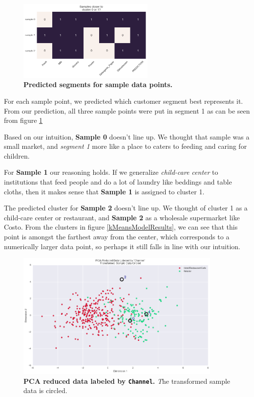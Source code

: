 \documentclass[twoside,openright,titlepage,numbers=noenddot,headinclude,%
               footinclude=true,cleardoublepage=empty,abstractoff,BCOR=5mm,%
               paper=a4,fontsize=11pt,ngerman,american]{scrreprt}
\numberwithin{theorem}{chapter}
\numberwithin{definition}{chapter}
\numberwithin{algorithm}{chapter}
\numberwithin{figure}{chapter}
\numberwithin{table}{chapter}
\numberwithin{equation}{chapter}
\begin{document}
\begin{figure}[!hbtp]
\centering
    
    \includegraphics[width=0.6\textwidth]{figures/samplePointSegment}
    
    \caption{\textbf{Predicted segments for sample data points.}}\label{samplePointSegment}
\end{figure}

For each sample point, we predicted which customer segment best represents it. From our prediction, all three sample points were put in segment 1 as can be seen from figure \ref{samplePointSegment} 

Based on our intuition, \textbf{Sample 0} doesn't line up. We thought that sample was a small market, and \emph{segment 1} more like a place to caters to feeding and caring for children.

For \textbf{Sample 1} our reasoning holds. If we generalize \emph{child-care center} to institutions that feed people and do a lot of laundry like beddings and table cloths, then it makes sense that \textbf{Sample 1} is assigned to cluster 1.

The predicted cluster for \textbf{Sample 2} doesn't line up. We thought of cluster 1 as a child-care center or restaurant, and \textbf{Sample 2} as a wholesale supermarket like Costo. From the clusters in figure \ref{kMeansModelResults}, we can see that this point is amongst the farthest away from the center, which corresponds to a numerically larger data point, so perhaps it still falls in line with our intuition.


\begin{figure}[!hbtp]
\centering
    
    \includegraphics[width=0.9\textwidth]{figures/regions}
    
    \caption{\textbf{PCA reduced data labeled by \texttt{Channel}.} \textit The transformed sample data is circled. }\label{regions}
\end{figure}
\end{document}
